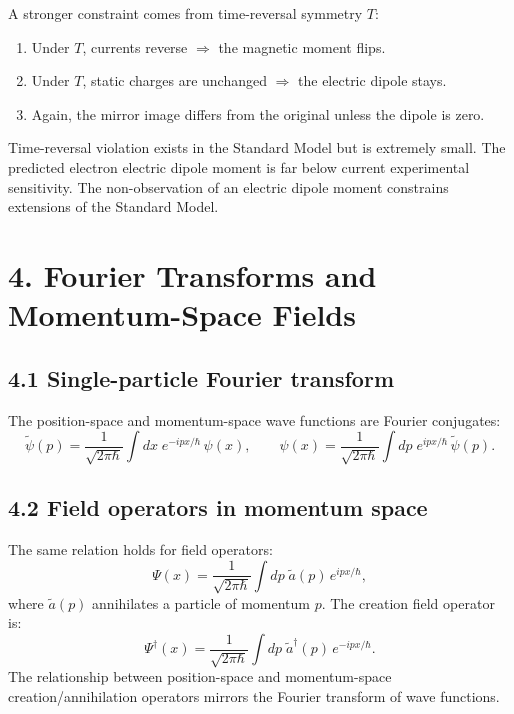 \documentclass[12pt,a4paper]{article}
\begin{document}
A stronger constraint comes from time-reversal symmetry $T$:
\begin{enumerate}[nosep]
    \item Under $T$, currents reverse $\Rightarrow$ the magnetic moment flips.
    \item Under $T$, static charges are unchanged $\Rightarrow$ the electric dipole stays.
    \item Again, the mirror image differs from the original unless the dipole is zero.
\end{enumerate}
Time-reversal violation exists in the Standard Model but is extremely small.  The predicted electron electric dipole moment is far below current experimental sensitivity.  The non-observation of an electric dipole moment constrains extensions of the Standard Model.

\section{4. Fourier Transforms and Momentum-Space Fields}

\subsection{4.1 Single-particle Fourier transform}

The position-space and momentum-space wave functions are Fourier conjugates:
\[
    \tilde{\psi}(p) = \frac{1}{\sqrt{2\pi\hbar}}\int dx\;e^{-ipx/\hbar}\,\psi(x), \qquad
    \psi(x) = \frac{1}{\sqrt{2\pi\hbar}}\int dp\;e^{ipx/\hbar}\,\tilde{\psi}(p).
\]

\subsection{4.2 Field operators in momentum space}

The same relation holds for field operators:
\[
    \Psi(x) = \frac{1}{\sqrt{2\pi\hbar}}\int dp\;\tilde{a}(p)\,e^{ipx/\hbar},
\]
where $\tilde{a}(p)$ annihilates a particle of momentum $p$.  The creation field operator is:
\[
    \Psi^\dagger(x) = \frac{1}{\sqrt{2\pi\hbar}}\int dp\;\tilde{a}^\dagger(p)\,e^{-ipx/\hbar}.
\]
The relationship between position-space and momentum-space creation/annihilation operators mirrors the Fourier transform of wave functions.

\end{document}
